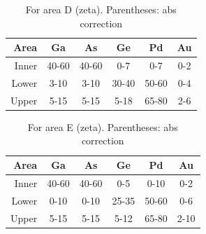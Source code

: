 
\begin{table}
	\caption{For area D (zeta). Parentheses: abs correction}
	\begin{center}
		\begin{tabular}{r|ccccc}			
			Area & Ga & As & Ge & Pd & Au\\ 
			\midrule
			\hline
			Inner & 40-60 & 40-60 & 0-7 & 0-7 & 0-2\\
			Lower & 3-10& 3-10 & 30-40 & 50-60 & 0-4\\
			Upper & 5-15& 5-15 & 5-18 & 65-80 & 2-6\\
			\hline
		\end{tabular} 
	\end{center}
	\label{tab:D-composition}
\end{table}

\begin{table}
	\caption{For area E (zeta). Parentheses: abs correction}
	\begin{center}
		\begin{tabular}{r|ccccc}			
			Area & Ga & As & Ge & Pd & Au\\ 
			\midrule
			\hline
			Inner& 40-60 & 40-60 & 0-5 & 0-10 & 0-2\\
			Lower& 0-10 & 0-10 & 25-35 & 50-60 & 0-6\\
			Upper& 5-15 & 5-15 & 5-12 & 65-80 & 2-10\\
			\hline
		\end{tabular} 
	\end{center}
	\label{tab:E-composition}
\end{table}

